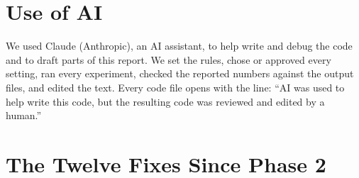 \documentclass[sigconf,nonacm,10pt]{acmart}
\begin{document}
\section{Use of AI}
\label{sec:ai}

We used Claude (Anthropic), an AI assistant, to help write and debug the code and to draft parts of this report. We set the rules, chose or approved every setting, ran every experiment, checked the reported numbers against the output files, and edited the text. Every code file opens with the line: ``AI was used to help write this code, but the resulting code was reviewed and edited by a human.''




\appendix

\section{The Twelve Fixes Since Phase 2}
\label{app:fixes}
\end{document}
